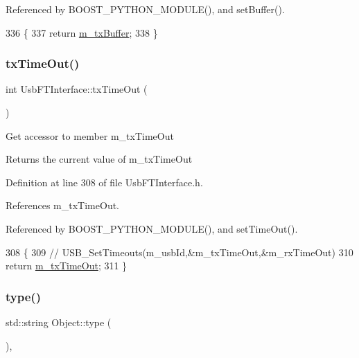 Referenced by B\+O\+O\+S\+T\+\_\+\+P\+Y\+T\+H\+O\+N\+\_\+\+M\+O\+D\+U\+L\+E(), and set\+Buffer().


\begin{DoxyCode}
336                   \{
337     \textcolor{keywordflow}{return} \hyperlink{classUsbFTInterface_a10385649160531f6976d55176bee1f2d}{m\_txBuffer};
338   \}
\end{DoxyCode}
\mbox{\label{classUsbFTInterface_acab2397cb42003a1ed8f69a0c6cae195}} 
\subsubsection{\texorpdfstring{tx\+Time\+Out()}{txTimeOut()}}
{\footnotesize\ttfamily int Usb\+F\+T\+Interface\+::tx\+Time\+Out (\begin{DoxyParamCaption}{ }\end{DoxyParamCaption})\hspace{0.3cm}{\ttfamily [inline]}}

Get accessor to member m\+\_\+tx\+Time\+Out \begin{DoxyReturn}{Returns}
the current value of m\+\_\+tx\+Time\+Out 
\end{DoxyReturn}


Definition at line 308 of file Usb\+F\+T\+Interface.\+h.



References m\+\_\+tx\+Time\+Out.



Referenced by B\+O\+O\+S\+T\+\_\+\+P\+Y\+T\+H\+O\+N\+\_\+\+M\+O\+D\+U\+L\+E(), and set\+Time\+Out().


\begin{DoxyCode}
308                    \{
309     \textcolor{comment}{//    USB\_SetTimeouts(m\_usbId,&m\_txTimeOut,&m\_rxTimeOut)}
310     \textcolor{keywordflow}{return} \hyperlink{classUsbFTInterface_af88e498a8ed759e35ae9e94f74ffcf56}{m\_txTimeOut};
311   \}  
\end{DoxyCode}
\mbox{\label{classObject_a84f99f70f144a83e1582d1d0f84e4e62}} 
\subsubsection{\texorpdfstring{type()}{type()}}
{\footnotesize\ttfamily std\+::string Object\+::type (\begin{DoxyParamCaption}{ }\end{DoxyParamCaption})\hspace{0.3cm}{\ttfamily [inline]}, {\ttfamily [inherited]}}



